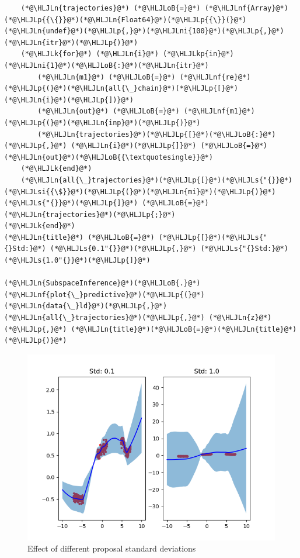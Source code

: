 \documentclass[12pt,a4paper]{article}
\newcommand{\HLJLk}[1]{\textcolor[RGB]{148,91,176}{\textbf{#1}}}
\newcommand{\HLJLkp}[1]{\textcolor[RGB]{148,91,176}{\textbf{#1}}}
\newcommand{\HLJLn}[1]{#1}
\newcommand{\HLJLnf}[1]{\textcolor[RGB]{66,102,213}{#1}}
\newcommand{\HLJLs}[1]{\textcolor[RGB]{201,61,57}{#1}}
\newcommand{\HLJLsi}[1]{#1}
\newcommand{\HLJLni}[1]{\textcolor[RGB]{59,151,46}{#1}}
\newcommand{\HLJLoB}[1]{\textcolor[RGB]{102,102,102}{\textbf{#1}}}
\newcommand{\HLJLp}[1]{#1}
\begin{document}
\begin{lstlisting}
    (*@\HLJLn{trajectories}@*) (*@\HLJLoB{=}@*) (*@\HLJLnf{Array}@*)(*@\HLJLp{{\{}}@*)(*@\HLJLn{Float64}@*)(*@\HLJLp{{\}}(}@*)(*@\HLJLn{undef}@*)(*@\HLJLp{,}@*)(*@\HLJLni{100}@*)(*@\HLJLp{,}@*)(*@\HLJLn{itr}@*)(*@\HLJLp{)}@*)
    (*@\HLJLk{for}@*) (*@\HLJLn{i}@*) (*@\HLJLkp{in}@*) (*@\HLJLni{1}@*)(*@\HLJLoB{:}@*)(*@\HLJLn{itr}@*)
        (*@\HLJLn{m1}@*) (*@\HLJLoB{=}@*) (*@\HLJLnf{re}@*)(*@\HLJLp{(}@*)(*@\HLJLn{all{\_}chain}@*)(*@\HLJLp{[}@*)(*@\HLJLn{i}@*)(*@\HLJLp{])}@*)
        (*@\HLJLn{out}@*) (*@\HLJLoB{=}@*) (*@\HLJLnf{m1}@*)(*@\HLJLp{(}@*)(*@\HLJLn{inp}@*)(*@\HLJLp{)}@*)
        (*@\HLJLn{trajectories}@*)(*@\HLJLp{[}@*)(*@\HLJLoB{:}@*)(*@\HLJLp{,}@*) (*@\HLJLn{i}@*)(*@\HLJLp{]}@*) (*@\HLJLoB{=}@*) (*@\HLJLn{out}@*)(*@\HLJLoB{{\textquotesingle}}@*)
    (*@\HLJLk{end}@*)
    (*@\HLJLn{all{\_}trajectories}@*)(*@\HLJLp{[}@*)(*@\HLJLs{"{}}@*)(*@\HLJLsi{{\$}}@*)(*@\HLJLp{(}@*)(*@\HLJLn{mi}@*)(*@\HLJLp{)}@*)(*@\HLJLs{"{}}@*)(*@\HLJLp{]}@*) (*@\HLJLoB{=}@*) (*@\HLJLn{trajectories}@*)(*@\HLJLp{;}@*)
(*@\HLJLk{end}@*)
(*@\HLJLn{title}@*) (*@\HLJLoB{=}@*) (*@\HLJLp{[}@*)(*@\HLJLs{"{}Std:}@*) (*@\HLJLs{0.1"{}}@*)(*@\HLJLp{,}@*) (*@\HLJLs{"{}Std:}@*) (*@\HLJLs{1.0"{}}@*)(*@\HLJLp{]}@*)

(*@\HLJLn{SubspaceInference}@*)(*@\HLJLoB{.}@*)(*@\HLJLnf{plot{\_}predictive}@*)(*@\HLJLp{(}@*)(*@\HLJLn{data{\_}ld}@*)(*@\HLJLp{,}@*) (*@\HLJLn{all{\_}trajectories}@*)(*@\HLJLp{,}@*) (*@\HLJLn{z}@*)(*@\HLJLp{,}@*) (*@\HLJLn{title}@*)(*@\HLJLoB{=}@*)(*@\HLJLn{title}@*)(*@\HLJLp{)}@*)
\end{lstlisting}

\begin{figure}
\centering
\includegraphics{img/st_comp_sub.png}
\caption{Effect of different proposal standard deviations}
\end{figure}
\end{document}
